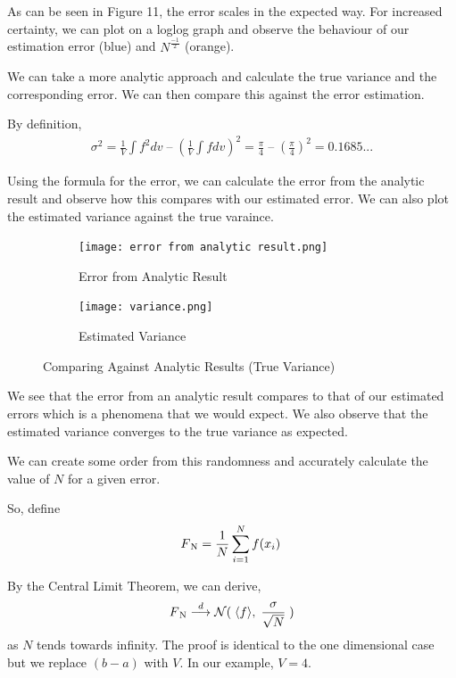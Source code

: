 \documentclass[12pt]{article}
\begin{document}
As can be seen in Figure 11, the error scales in the expected way. For increased certainty, we can plot on a loglog graph and observe the behaviour of our estimation error (blue) and $N^{\frac{-1}{2}}$ (orange). 

We can take a more analytic approach and calculate the true variance and the corresponding error. We can then compare this against the error estimation.

By definition,
 \begin{align} 
\sigma^2 = \frac{1}{V}\int f^2 dv \; – \; (\frac{1}{V}\int f dv)^2 = \frac{\pi}{4} \; – \; (\frac{\pi}{4})^2 =  0.1685...
\end{align}

Using the formula for the error, we can calculate the error from the analytic result and observe how this compares with our estimated error. We can also plot the estimated variance against the true varaince.

\begin{figure}[h]
\begin{subfigure}{0.5\textwidth}
\texttt{[image: error from analytic result.png]} 
\caption{Error from Analytic Result}
\label{fig:subim1}
\end{subfigure}
\begin{subfigure}{0.5\textwidth}
\texttt{[image: variance.png]}
\caption{Estimated Variance}
\label{fig:subim2}
\end{subfigure}
\caption{Comparing Against Analytic Results (True Variance)}
\label{fig:image2}
\end{figure}

We see that the error from an analytic result compares to that of our estimated errors which is a phenomena that we would expect. We also observe that the estimated variance converges to the true variance as expected. 

We can create some order from this randomness and accurately calculate the value of $N$ for a given error. 

So, define
 \begin{align} 
F\textsubscript{N} = \frac{1}{N}\sum_{i=1}^{N} f(x_{i})\,
\end{align}

By the Central Limit Theorem, we can derive,
 \begin{align} 
F\textsubscript{N} \overset{d}{\longrightarrow}  \mathcal{N}(\;\langle f\rangle,\;\frac{\sigma}{\sqrt{N}}\;)
\end{align}
as $N$ tends towards infinity. The proof is identical to the one dimensional case but we replace $(b - a)$ with $V$. In our example, $V = 4$.
\end{document}
